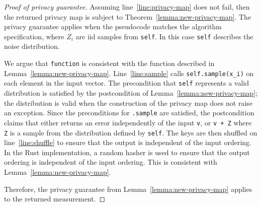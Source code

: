 \documentclass{article}
\begin{document}
\begin{proof}[Proof of privacy guarantee]
    Assuming line~\ref{line:privacy-map} does not fail,
    then the returned privacy map is subject to Theorem~\ref{lemma:new-privacy-map}.
    The privacy guarantee applies when the pseudocode matches the algorithm specification, 
    where $Z_i$ are iid samples from \texttt{self}.
    In this case \texttt{self} describes the noise distribution.

    We argue that \texttt{function} is consistent with the function described in Lemma~\ref{lemma:new-privacy-map}.
    Line~\ref{line:sample} calls \texttt{self.sample(x\_i)} on each element in the input vector.
    The precondition that \texttt{self} represents a valid distribution is satisfied by the postcondition of Lemma~\ref{lemma:new-privacy-map};
    the distribution is valid when the construction of the privacy map does not raise an exception.
    Since the preconditions for \texttt{.sample} are satisfied,
    the postcondition claims that either returns an error independently of the input \texttt{v},
    or \texttt{v + Z} where \texttt{Z} is a sample from the distribution defined by \texttt{self}.
    The keys are then shuffled on line~\ref{line:shuffle} to ensure that the output is independent of the input ordering.
    In the Rust implementation, a random hasher is used to ensure that the output ordering is independent of the input ordering.
    This is consistent with Lemma~\ref{lemma:new-privacy-map}.

    Therefore, the privacy guarantee from Lemma~\ref{lemma:new-privacy-map} applies to the returned measurement.
\end{proof}
\end{document}
